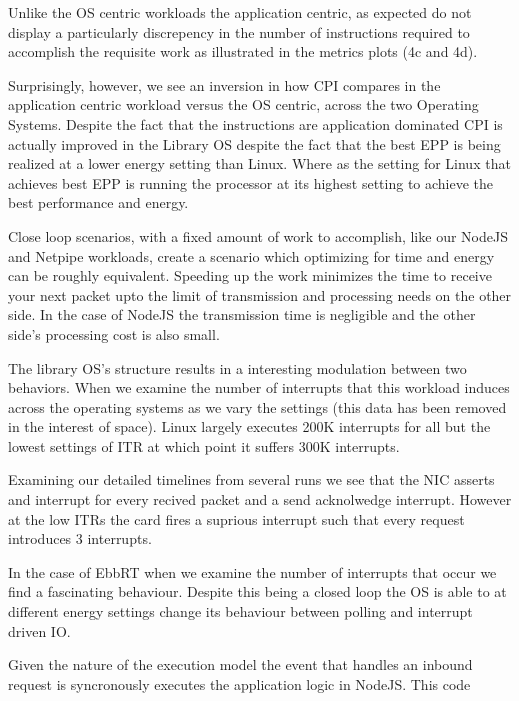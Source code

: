 Unlike the OS centric workloads the application centric, as expected do not display a particularly discrepency in the number of instructions required to accomplish the requisite work as illustrated in the metrics plots (4c and 4d).  

Surprisingly, however, we see an inversion in how CPI compares in the application centric workload versus the OS centric, across the two Operating Systems.  Despite the fact that the instructions are application dominated CPI is actually improved in the Library OS despite the fact that the best EPP is being realized at a lower energy setting than Linux.  Where as the setting for Linux that achieves best EPP is running the processor at its highest setting to achieve the best performance and energy.

Close loop scenarios, with a fixed amount of work to accomplish, like  our NodeJS and Netpipe workloads, create a scenario which optimizing for time and energy can be roughly equivalent.  Speeding up the work minimizes the time to receive your next packet upto the limit of transmission and processing needs on the other side.  In the case of NodeJS the transmission time is negligible and the other side's processing cost is also small.   


The library OS's structure results in a interesting modulation between two behaviors.  When we examine the number of interrupts that this workload induces across the operating systems as we vary the settings (this data has been removed in the interest of space).  Linux largely executes 200K interrupts for all but the lowest settings of ITR at which point it suffers 300K interrupts.  

Examining our detailed timelines from several runs we see that the NIC asserts and interrupt for every recived packet and a send acknolwedge interrupt.  However at the low ITRs the card fires a suprious interrupt such that every request introduces 3 interrupts. 

In the case of EbbRT when we examine the number of interrupts that occur we find a fascinating behaviour.  Despite this being a closed loop the OS is able to at different energy settings change its behaviour between polling and interrupt driven IO.  

Given the nature of the execution model the event that handles an inbound request is syncronously executes the application logic in NodeJS.  This code 






